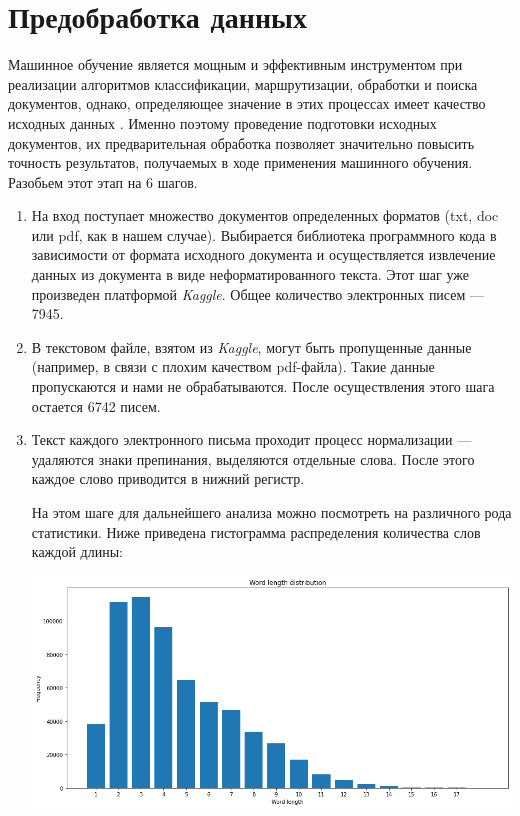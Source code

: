 \chapter{Предобработка данных}

Машинное обучение является мощным и эффективным инструментом при реализации
алгоритмов классификации, маршрутизации, обработки и поиска документов, однако, определяющее значение в этих процессах имеет качество исходных данных \cite{bib2}. Именно поэтому проведение подготовки исходных документов, их предварительная обработка позволяет значительно повысить точность результатов, получаемых в ходе применения
машинного обучения. Разобьем этот этап на 6 шагов.

\begin{enumerate}

\item На вход поступает множество документов определенных форматов (txt, doc или pdf, как в нашем случае). Выбирается библиотека программного кода в зависимости от формата исходного документа и осуществляется извлечение данных из документа в виде неформатированного текста. Этот шаг уже произведен платформой \textit{Kaggle}. Общее количество электронных писем --- 7945.

\item В текстовом файле, взятом из \textit{Kaggle}, могут быть пропущенные данные (например, в связи с плохим качеством pdf-файла). Такие данные пропускаются и нами не обрабатываются. После осуществления этого шага остается 6742 писем. 

\item Текст каждого электронного письма проходит процесс нормализации --- удаляются знаки препинания, выделяются отдельные слова. После этого каждое слово приводится в нижний регистр. 

На этом шаге для дальнейшего анализа можно посмотреть на различного рода статистики.
Ниже приведена гистограмма распределения количества слов каждой длины: 

\includegraphics[scale=0.5]{pics/word_lengths.png}


\end{enumerate}
